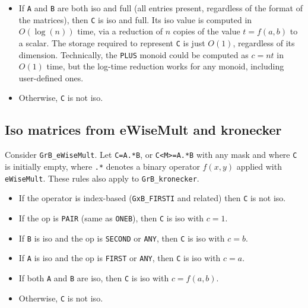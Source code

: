 \begin{itemize}
    \item If \verb'A' and \verb'B' are both iso and full (all entries present,
    regardless of the format of the matrices), then \verb'C' is iso and full.
    Its iso value is computed in $O(\log(n))$ time, via a reduction of $n$
    copies of the value $t=f(a,b)$ to a scalar.  The storage required to
    represent \verb'C' is just $O(1)$, regardless of its dimension.
    Technically, the \verb'PLUS' monoid could be computed as $c=nt$ in $O(1)$
    time, but the log-time reduction works for any monoid, including
    user-defined ones.

    \item Otherwise, \verb'C' is not iso.
    \end{itemize}

\subsection{Iso matrices from eWiseMult and kronecker}
\label{iso_emult}

Consider \verb'GrB_eWiseMult'.  Let
\verb'C=A.*B', or \verb'C<M>=A.*B' with any mask and where \verb'C' is
initially empty, where \verb'.*' denotes a binary operator $f(x,y)$
applied with \verb'eWiseMult'.  These rules also apply to \verb'GrB_kronecker'.

    \begin{itemize}
    \item If the operator is index-based (\verb'GxB_FIRSTI' and related) then
    \verb'C' is not iso.

    \item If the op is \verb'PAIR' (same as \verb'ONEB'),
        then \verb'C' is iso with $c=1$.

    \item If \verb'B' is iso and the op is \verb'SECOND' or \verb'ANY',
        then \verb'C' is iso with $c=b$.

    \item If \verb'A' is iso and the op is \verb'FIRST' or \verb'ANY',
        then \verb'C' is iso with $c=a$.

    \item If both \verb'A' and \verb'B' are iso,
        then \verb'C' is iso with $c=f(a,b)$.

    \item Otherwise, \verb'C' is not iso.
    \end{itemize}

